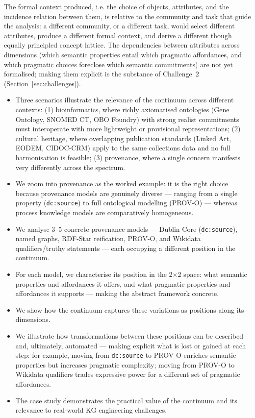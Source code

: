 \documentclass[runningheads]{llncs}
\newcommand{\add}[1]{\textcolor{addedcolor}{#1}}
\begin{document}
\add{The formal context produced, i.e. the choice of objects, attributes, and the incidence relation between them, is relative to the community and task that guide the analysis: a different community, or a different task, would select different attributes, produce a different formal context, and derive a different though equally principled concept
lattice. The dependencies between attributes across dimensions (which semantic properties entail which pragmatic affordances, and which
pragmatic choices foreclose which semantic commitments) are not yet formalised; making them explicit is the substance of
Challenge~2 (Section~\ref{sec:challenges}). }




\begin{itemize}
    \item Three scenarios illustrate the relevance of the continuum across different contexts: (1) bioinformatics, where richly axiomatised ontologies (Gene Ontology, SNOMED CT, OBO Foundry) with strong realist commitments must interoperate with more lightweight or provisional representations; (2) cultural heritage, where overlapping publication standards (Linked Art, EODEM, CIDOC-CRM) apply to the same collections data and no full harmonisation is feasible; (3) provenance, where a single concern manifests very differently across the spectrum. %
    \item We zoom into provenance as the worked example: it is the right choice because provenance models are genuinely diverse --- ranging from a single property (\texttt{dc:source}) to full ontological modelling (PROV-O) --- whereas process knowledge models are comparatively homogeneous. %
    \item We analyse 3--5 concrete provenance models --- Dublin Core (\texttt{dc:source}), named graphs, RDF-Star reification, PROV-O, and Wikidata qualifiers/truthy statements --- each occupying a different position in the continuum. %
    \item For each model, we characterise its position in the 2$\times$2 space: what semantic properties and affordances it offers, and what pragmatic properties and affordances it supports --- making the abstract framework concrete. %
    \item We show how the continuum captures these variations as positions along its dimensions.
    \item We illustrate how transformations between these positions can be described and, ultimately, automated --- making explicit what is lost or gained at each step: for example, moving from \texttt{dc:source} to PROV-O enriches semantic properties but increases pragmatic complexity; moving from PROV-O to Wikidata qualifiers trades expressive power for a different set of pragmatic affordances. %
    \item The case study demonstrates the practical value of the continuum and its relevance to real-world KG engineering challenges.
\end{itemize}
\end{document}
